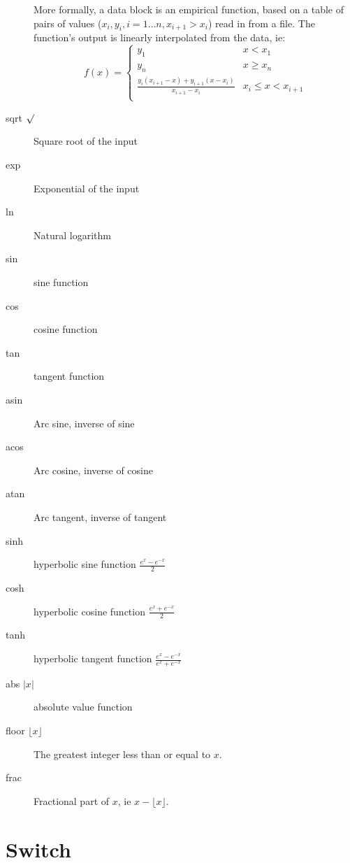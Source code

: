 \begin{description}
More formally, a data block is an empirical function, based on a table
of pairs of values ($x_i, y_i, i=1\ldots n, x_{i+1}>x_i$) read in from
a file. The function's output is linearly interpolated from the data,
ie:
\begin{displaymath}
f(x) = \left\{
\begin{array}{cl}
y_1 & x < x_1\\
y_n & x\geq x_n\\
\frac{y_i(x_{i+1}-x)+y_{i+1}(x-x_i)}{x_{i+1}-x_i} & x_i \leq x <
x_{i+1}\\
\end{array}
\right.
\end{displaymath}

\item[sqrt $\surd$]\label{op:sqrt} Square root of the input

\item[exp]\label{op:exp} Exponential of the input

\item[ln]\label{op:ln} Natural logarithm

\item[sin]\label{op:sin} sine function
\item[cos]\label{op:cos} cosine function
\item[tan]\label{op:tan} tangent function
\item[asin]\label{op:asin} Arc sine, inverse of sine
\item[acos]\label{op:acos} Arc cosine, inverse of cosine
\item[atan]\label{op:atan} Arc tangent, inverse of tangent
\item[sinh]\label{op:sinh} hyperbolic sine function $\frac{e^x-e^{-x}}2$
\item[cosh]\label{op:cosh} hyperbolic cosine function $\frac{e^x+e^{-x}}2$
\item[tanh]\label{op:tanh} hyperbolic tangent function $\frac{e^x-e^{-x}}{e^x+e^{-x}}$
\item[abs $|x|$]\label{op:abs} absolute value function
\item[floor $\lfloor x\rfloor$]\label{op:floor} The greatest integer
  less than or equal to $x$.
\item[frac]\label{op:frac} Fractional part of $x$, ie $x-\lfloor x\rfloor$. 

\end{description}

\section{Switch}\label{switch}

